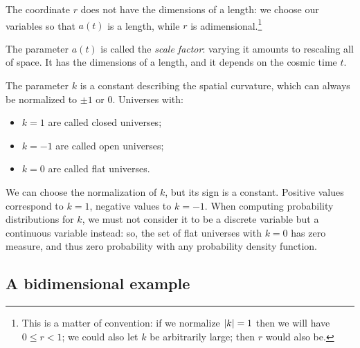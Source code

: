 \documentclass[main.tex]{subfiles}
\begin{document}

The coordinate \(r\) does not have the dimensions of a length: we choose our variables so that \(a(t)\) is a length, while \(r\) is adimensional.\footnote{This is a matter of convention: if we normalize \(\abs{k}=1\) then we will have \(0 \leq r < 1\); we could also let \(k\) be arbitrarily large; then \(r\) would also be.}

The parameter \(a(t)\) is called the \emph{scale factor}: varying it amounts to rescaling all of space.
It has the dimensions of a length, and it depends on the cosmic time \(t\).

The parameter \(k\) is a constant describing the spatial curvature, which can always be normalized to \(\pm 1\) or \(0\).
Universes with:
\begin{itemize}
    \item \(k=1\) are called closed universes;
    \item \(k=-1\) are called open universes;
    \item \(k=0\) are called flat universes.
\end{itemize}

We can choose the normalization of \(k\), but its sign is a constant.
Positive values correspond to \(k=1\), negative values to \(k=-1\).
When computing probability distributions for \(k\), we must not consider it to be a discrete variable but a continuous variable instead: so, the set of flat universes with \(k=0\) has zero measure, and thus zero probability with any probability density function.





\subsection{A bidimensional example}
\end{document}
